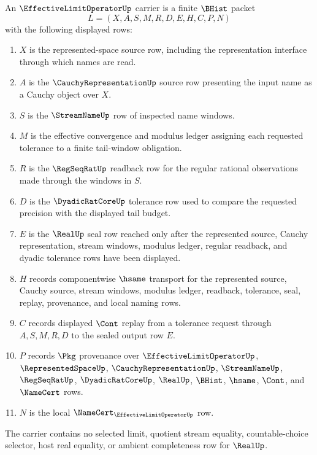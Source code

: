 \begin{definition}
\label{def:effective-limit-operator-carrier}
An $\EffectiveLimitOperatorUp$ carrier is a finite $\BHist$ packet
$$
L=(X,A,S,M,R,D,E,H,C,P,N)
$$
with the following displayed rows:
\begin{enumerate}
\item $X$ is the represented-space source row, including the representation interface through which names are read.
\item $A$ is the $\CauchyRepresentationUp$ source row presenting the input name as a Cauchy object over $X$.
\item $S$ is the $\StreamNameUp$ row of inspected name windows.
\item $M$ is the effective convergence and modulus ledger assigning each requested tolerance to a finite tail-window obligation.
\item $R$ is the $\RegSeqRatUp$ readback row for the regular rational observations made through the windows in $S$.
\item $D$ is the $\DyadicRatCoreUp$ tolerance row used to compare the requested precision with the displayed tail budget.
\item $E$ is the $\RealUp$ seal row reached only after the represented source, Cauchy representation, stream windows, modulus ledger, regular readback, and dyadic tolerance rows have been displayed.
\item $H$ records componentwise $\hsame$ transport for the represented source, Cauchy source, stream windows, modulus ledger, readback, tolerance, seal, replay, provenance, and local naming rows.
\item $C$ records displayed $\Cont$ replay from a tolerance request through $A,S,M,R,D$ to the sealed output row $E$.
\item $P$ records $\Pkg$ provenance over $\EffectiveLimitOperatorUp$, $\RepresentedSpaceUp$, $\CauchyRepresentationUp$, $\StreamNameUp$, $\RegSeqRatUp$, $\DyadicRatCoreUp$, $\RealUp$, $\BHist$, $\hsame$, $\Cont$, and $\NameCert$ rows.
\item $N$ is the local $\NameCert_{\EffectiveLimitOperatorUp}$ row.
\end{enumerate}
The carrier contains no selected limit, quotient stream equality, countable-choice selector, host real equality, or ambient completeness row for $\RealUp$.
\end{definition}

